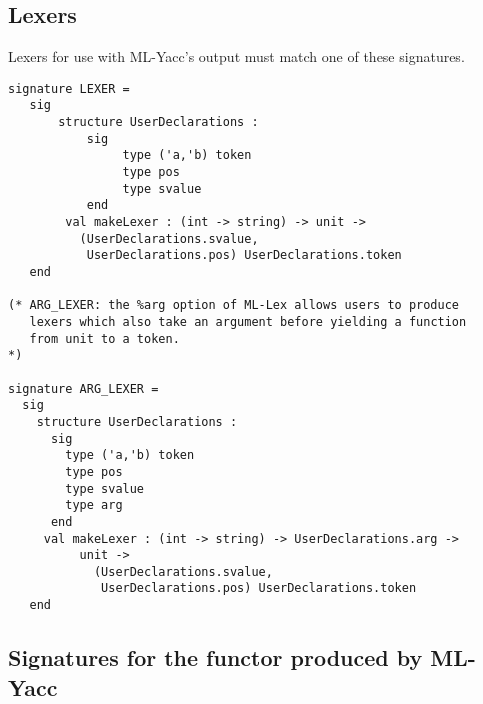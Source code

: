 \subsection{Lexers}

Lexers for use with ML-Yacc's output must match one of these signatures.

\begin{tt}
\begin{verbatim}
signature LEXER =
   sig
       structure UserDeclarations :
           sig
                type ('a,'b) token
                type pos
                type svalue
           end
        val makeLexer : (int -> string) -> unit -> 
          (UserDeclarations.svalue,
           UserDeclarations.pos) UserDeclarations.token
   end

(* ARG_LEXER: the %arg option of ML-Lex allows users to produce
   lexers which also take an argument before yielding a function
   from unit to a token.
*)

signature ARG_LEXER =
  sig
    structure UserDeclarations :
      sig
        type ('a,'b) token
        type pos
        type svalue
        type arg
      end
     val makeLexer : (int -> string) -> UserDeclarations.arg ->
          unit -> 
            (UserDeclarations.svalue,
             UserDeclarations.pos) UserDeclarations.token
   end
\end{verbatim}
\end{tt}

\subsection{Signatures for the functor produced by ML-Yacc}

